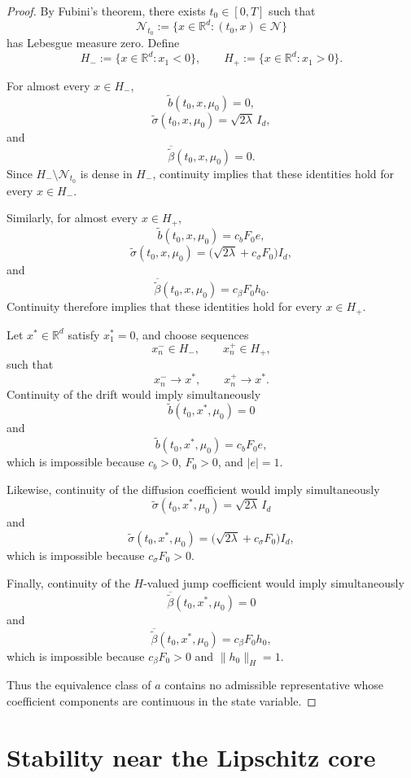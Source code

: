 \documentclass[12pt,oneside, reqno]{amsart}
\numberwithin{equation}{section}
\begin{document}
\begin{proof}
		By Fubini's theorem, there exists $t_0\in[0,T]$ such that
		\[
		\mathcal N_{t_0}
		:=
		\{x\in\mathbb R^d:(t_0,x)\in\mathcal N\}
		\]
		has Lebesgue measure zero. Define
		\[
		H_-:=\{x\in\mathbb R^d:x_1<0\},
		\qquad
		H_+:=\{x\in\mathbb R^d:x_1>0\}.
		\]
		
		For almost every $x\in H_-$,
		\[
		\widetilde b(t_0,x,\mu_0)=0,
		\]
		\[
		\widetilde\sigma(t_0,x,\mu_0)
		=
		\sqrt{2\lambda}\,I_d,
		\]
		and
		\[
		\overline{\widetilde\beta}(t_0,x,\mu_0)=0.
		\]
		Since $H_-\setminus\mathcal N_{t_0}$ is dense in $H_-$,
		continuity implies that these identities hold for every
		$x\in H_-$.
		
		Similarly, for almost every $x\in H_+$,
		\[
		\widetilde b(t_0,x,\mu_0)
		=
		c_bF_0e,
		\]
		\[
		\widetilde\sigma(t_0,x,\mu_0)
		=
		\bigl(
		\sqrt{2\lambda}+c_\sigma F_0
		\bigr)I_d,
		\]
		and
		\[
		\overline{\widetilde\beta}(t_0,x,\mu_0)
		=
		c_\beta F_0h_0.
		\]
		Continuity therefore implies that these identities hold for every
		$x\in H_+$.
		
		Let $x^\ast\in\mathbb R^d$ satisfy $x_1^\ast=0$, and choose
		sequences
		\[
		x_n^-\in H_-,
		\qquad
		x_n^+\in H_+,
		\]
		such that
		\[
		x_n^-\longrightarrow x^\ast,
		\qquad
		x_n^+\longrightarrow x^\ast.
		\]
		Continuity of the drift would imply simultaneously
		\[
		\widetilde b(t_0,x^\ast,\mu_0)=0
		\]
		and
		\[
		\widetilde b(t_0,x^\ast,\mu_0)
		=
		c_bF_0e,
		\]
		which is impossible because $c_b>0$, $F_0>0$, and $|e|=1$.
		
		Likewise, continuity of the diffusion coefficient would imply
		simultaneously
		\[
		\widetilde\sigma(t_0,x^\ast,\mu_0)
		=
		\sqrt{2\lambda}\,I_d
		\]
		and
		\[
		\widetilde\sigma(t_0,x^\ast,\mu_0)
		=
		\bigl(
		\sqrt{2\lambda}+c_\sigma F_0
		\bigr)I_d,
		\]
		which is impossible because $c_\sigma F_0>0$.
		
		Finally, continuity of the $H$-valued jump coefficient would imply
		simultaneously
		\[
		\overline{\widetilde\beta}(t_0,x^\ast,\mu_0)=0
		\]
		and
		\[
		\overline{\widetilde\beta}(t_0,x^\ast,\mu_0)
		=
		c_\beta F_0h_0,
		\]
		which is impossible because $c_\beta F_0>0$ and
		$\|h_0\|_H=1$.
		
		Thus the equivalence class of $a$ contains no admissible
		representative whose coefficient components are continuous in the
		state variable.
	\end{proof}
	
	
	\section{Stability near the Lipschitz core}
	\label{sec:stability-core}
	
\end{document}

